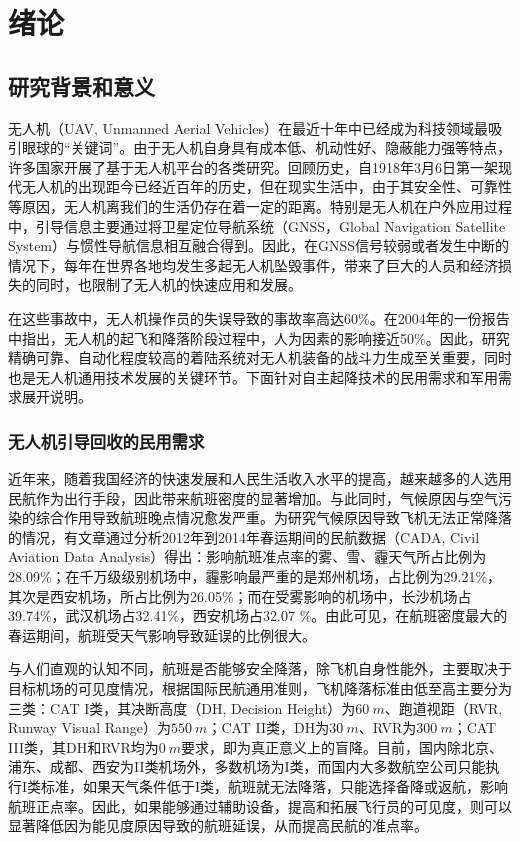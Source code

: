 \chapter{绪论}


\section{研究背景和意义}
无人机（UAV, Unmanned Aerial Vehicles）在最近十年中已经成为科技领域最吸引眼球的“关键词”。由于无人机自身具有成本低、机动性好、隐蔽能力强等特点，许多国家开展了基于无人机平台的各类研究。回顾历史，自1918年3月6日第一架现代无人机的出现距今已经近百年的历史，但在现实生活中，由于其安全性、可靠性等原因，无人机离我们的生活仍存在着一定的距离。特别是无人机在户外应用过程中，引导信息主要通过将卫星定位导航系统（GNSS，Global Navigation Satellite System）与惯性导航信息相互融合得到。因此，在GNSS信号较弱或者发生中断的情况下，每年在世界各地均发生多起无人机坠毁事件，带来了巨大的人员和经济损失的同时，也限制了无人机的快速应用和发展。

在这些事故中，无人机操作员的失误导致的事故率高达60\%\cite{arrabito2010human}。在2004年的一份报告中指出\cite{williams2004summary}，无人机的起飞和降落阶段过程中，人为因素的影响接近50\%。因此，研究精确可靠、自动化程度较高的着陆系统对无人机装备的战斗力生成至关重要，同时也是无人机通用技术发展的关键环节。下面针对自主起降技术的民用需求和军用需求展开说明。

\subsection{无人机引导回收的民用需求}
近年来，随着我国经济的快速发展和人民生活收入水平的提高，越来越多的人选用民航作为出行手段，因此带来航班密度的显著增加。与此同时，气候原因与空气污染的综合作用导致航班晚点情况愈发严重。为研究气候原因导致飞机无法正常降落的情况，有文章\cite{BigDataLanding}通过分析2012年到2014年春运期间的民航数据（CADA, Civil Aviation Data Analysis）得出：影响航班准点率的雾、雪、霾天气所占比例为28.09\%；在千万级级别机场中，霾影响最严重的是郑州机场，占比例为29.21\%，其次是西安机场，所占比例为26.05\%；而在受雾影响的机场中，长沙机场占39.74\%，武汉机场占32.41\%，西安机场占32.07 \%。由此可见，在航班密度最大的春运期间，航班受天气影响导致延误的比例很大。

与人们直观的认知不同，航班是否能够安全降落，除飞机自身性能外，主要取决于目标机场的可见度情况，根据国际民航通用准则，飞机降落标准由低至高主要分为三类：CAT I类，其决断高度（DH, Decision Height）为$60\ m$、跑道视距（RVR, Runway Visual Range）为$550\ m$；CAT II类，DH为$30\ m$、RVR为$300\ m$；CAT III类，其DH和RVR均为$0\ m$要求，即为真正意义上的盲降。目前，国内除北京、浦东、成都、西安为II类机场外，多数机场为I类，而国内大多数航空公司只能执行I类标准，如果天气条件低于I类，航班就无法降落，只能选择备降或返航，影响航班正点率。因此，如果能够通过辅助设备，提高和拓展飞行员的可见度，则可以显著降低因为能见度原因导致的航班延误，从而提高民航的准点率。

